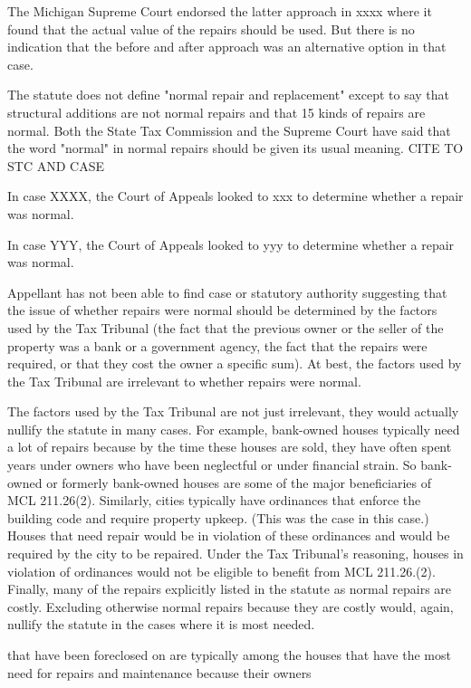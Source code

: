 The Michigan Supreme Court endorsed the latter approach in xxxx where it found that the actual value of the repairs should be used. But there is no indication that the before and after approach was an alternative option in that case. 

The statute does not define "normal repair and replacement" except to say that structural additions are not normal repairs and that 15 kinds of repairs are normal. Both the State Tax Commission and the Supreme Court have said that the word "normal" in normal repairs should be given its usual meaning. CITE TO STC AND CASE

In case XXXX, the Court of Appeals looked to xxx to determine whether a repair was normal.

In case YYY, the Court of Appeals looked to yyy to determine whether a repair was normal.

Appellant has not been able to find case or statutory authority suggesting that the issue of whether repairs were normal should be determined by the factors used by the Tax Tribunal (the fact that the previous owner or the seller of the property was a bank or a government agency, the fact that the repairs were required, or that they cost the owner a specific sum). At best, the factors used by the Tax Tribunal are irrelevant to whether repairs were normal. 

The factors used by the Tax Tribunal are not just irrelevant, they would actually nullify the statute in many cases. For example, bank-owned houses typically need a lot of repairs because by the time these houses are sold, they have often spent years under owners who have been neglectful or under financial strain. So bank-owned or formerly bank-owned houses are some of the major beneficiaries of MCL 211.26(2). Similarly, cities typically have ordinances that enforce the building code and require property upkeep. (This was the case in this case.) Houses that need repair would be in violation of these ordinances and would be required by the city to be repaired. Under the Tax Tribunal's reasoning, houses in violation of ordinances would not be eligible to benefit from MCL 211.26.(2). Finally, many of the repairs explicitly listed in the statute as normal repairs are costly. Excluding otherwise normal repairs because they are costly would, again, nullify the statute in the cases where it is most needed. 



that have been foreclosed on are typically among the houses that have the most need for repairs and maintenance because their owners 

